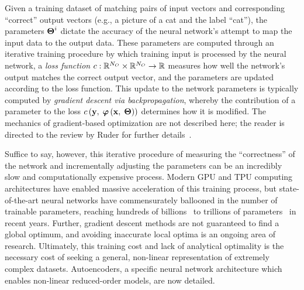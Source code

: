 Given a training dataset of matching pairs of input vectors and corresponding ``correct'' output vectors (e.g., a picture of a cat and the label ``cat''), the parameters $\boldsymbol{\Theta}^{i}$ dictate the accuracy of the neural network's attempt to map the input data to the output data. These parameters are computed through an iterative training procedure by which training input is processed by the neural network, a \textit{loss function} $c: \mathbb{R}^{N_{O}} \times \mathbb{R}^{N_{O}} \rightarrow \mathbb{R}$ measures how well the network's output matches the correct output vector, and the parameters are updated according to the loss function. This update to the network parameters is typically computed by \textit{gradient descent via backpropagation}, whereby the contribution of a parameter to the loss $c\left(\mathbf{y}, \; \boldsymbol{\varphi}\left({\mathbf{x}, \; \boldsymbol{\Theta}}\right)\right)$ determines how it is modified. The mechanics of gradient-based optimization are not described here; the reader is directed to the review by Ruder for further details~\cite{Ruder2016}.

Suffice to say, however, this iterative procedure of measuring the ``correctness'' of the network and incrementally adjusting the parameters can be an incredibly slow and computationally expensive process. Modern GPU and TPU computing architectures have enabled massive acceleration of this training process, but state-of-the-art neural networks have commensurately ballooned in the number of trainable parameters, reaching hundreds of billions~\cite{Brown2020} to trillions of parameters~\cite{Fedus2022} in recent years. Further, gradient descent methods are not guaranteed to find a global optimum, and avoiding inaccurate local optima is an ongoing area of research. Ultimately, this training cost and lack of analytical optimality is the necessary cost of seeking a general, non-linear representation of extremely complex datasets. Autoencoders, a specific neural network architecture which enables non-linear reduced-order models, are now detailed.

